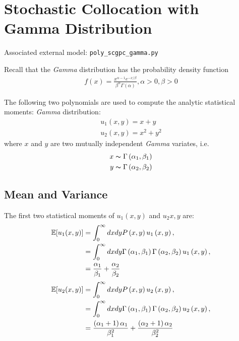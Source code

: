 \section{Stochastic Collocation with Gamma Distribution}
Associated external model: \texttt{poly\_scgpc\_gamma.py}

Recall that the \textit{Gamma} distribution has the probability density function
\begin{align}
  f(x) = \frac{x^{\alpha-1}e^{-x/\beta}}{\beta^\alpha\Gamma\left(\alpha\right)}, \alpha > 0, \beta > 0
\end{align}

The following two polynomials are used to compute the analytic statistical moments:
\textit{Gamma} distribution:
\begin{align}
  u_1(x, y) = x + y \\
  u_2(x, y) = x^2 + y^2
\end{align}
where $x$ and $y$ are two mutually independent \textit{Gamma} variates, i.e.
\begin{align}
  x \thicksim \Gamma\left(\alpha_{1},\beta_{1}\right) \notag \\
  y \thicksim \Gamma\left(\alpha_{2},\beta_{2}\right) \notag
\end{align}

\subsection{Mean and Variance}
The first two statistical moments of $u_1(x,y)$ and $u_2{x,y}$ are:
\begin{align}
  \mathbb{E}[ u_1(x,y)] &= \int_{0}^\infty dxdyP\left(x,y\right)u_1\left(x,y\right), \notag \\
  &= \int_{0}^\infty dxdy \Gamma\left(\alpha_{1},\beta_{1}\right) \Gamma\left(\alpha_{2},\beta_{2}\right) u_1\left(x,y\right), \notag \\
  &= \frac{\alpha_{1}}{\beta_{1}} + \frac{\alpha_{2}}{\beta_{2}}
\end{align}
\begin{align}
  \mathbb{E}[ u_2(x,y)] &= \int_{0}^\infty dxdyP\left(x,y\right)u_2\left(x,y\right), \notag \\
  &= \int_{0}^\infty dxdy \Gamma\left(\alpha_{1},\beta_{1}\right) \Gamma\left(\alpha_{2},\beta_{2}\right) u_2\left(x,y\right), \notag \\
  &= \frac{\left(\alpha_{1} + 1\right)\alpha_1}{\beta_{1}^2} + \frac{\left(\alpha_{2}+1\right)\alpha_2}{\beta_{2}^2}
\end{align}

